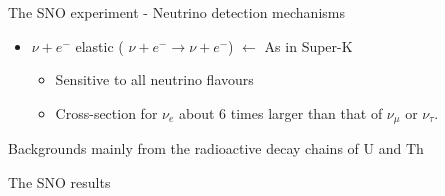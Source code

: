 \begin{frame}[t]{The SNO experiment - Neutrino detection mechanisms}
\begin{itemize}
\begin{itemize}
\begin{itemize}
                   \end{itemize}
     \end{itemize}
  \item $\nu+e^{-}$ elastic ({\color{green} $\nu+e^{-} \rightarrow \nu+e^{-} $}) $\leftarrow$ As in Super-K
     \begin{itemize}
          \item Sensitive to all neutrino flavours
          \item Cross-section for $\nu_{e}$ about 6 times larger than that of  $\nu_{\mu}$ or  $\nu_{\tau}$.
     \end{itemize}
\end{itemize}
Backgrounds mainly from the radioactive decay chains of U and Th
\end{frame}


\begin{frame}[t]{The SNO results}


\end{frame}
